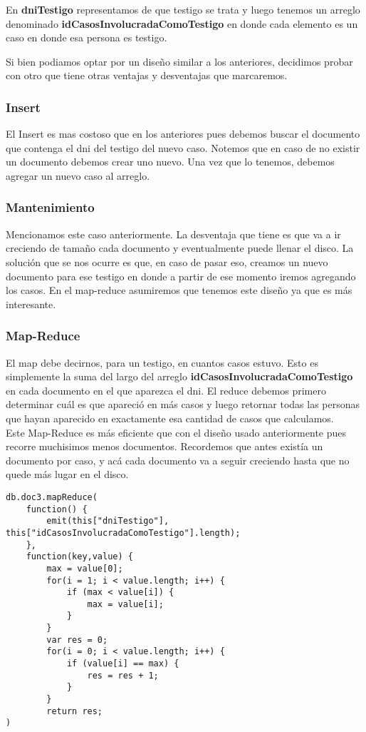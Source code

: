 \documentclass[11pt, a4paper]{article}
\begin{document}
En \textbf{dniTestigo} representamos de que testigo se trata y luego tenemos un arreglo denominado \textbf{idCasosInvolucradaComoTestigo} en donde cada elemento es un caso en donde esa persona es testigo.\

Si bien podiamos optar por un dise\~no similar a los anteriores, decidimos probar con otro que tiene otras ventajas y desventajas que marcaremos.

\subsubsection{Insert}

El Insert es mas costoso que en los anteriores pues debemos buscar el documento que contenga el dni del testigo del nuevo caso. Notemos que en caso de no existir un documento debemos crear uno nuevo. Una vez que lo tenemos, debemos agregar un nuevo caso al arreglo.

\subsubsection{Mantenimiento}

Mencionamos este caso anteriormente. La desventaja que tiene es que va a ir creciendo de tama\~no cada documento y eventualmente puede llenar el disco. La soluci\'on que se nos ocurre es que, en caso de pasar eso, creamos un nuevo documento para ese testigo en donde a partir de ese momento iremos agregando los casos. En el map-reduce asumiremos que tenemos este dise\~no ya que es m\'as interesante.

\subsubsection{Map-Reduce}

El map debe decirnos, para un testigo, en cuantos casos estuvo. Esto es simplemente la suma del largo del arreglo \textbf{idCasosInvolucradaComoTestigo} en cada documento en el que aparezca el dni. El reduce debemos primero determinar cu\'al es que apareci\'o en m\'as casos y luego retornar todas las personas que hayan aparecido en exactamente esa cantidad de casos que calculamos.\\

Este Map-Reduce es m\'as eficiente que con el dise\~no usado anteriormente pues recorre muchisimos menos documentos. Recordemos que antes exist\'ia un documento por caso, y ac\'a cada documento va a seguir creciendo hasta que no quede m\'as lugar en el disco.
\begin{lstlisting}
db.doc3.mapReduce(
    function() {
        emit(this["dniTestigo"], this["idCasosInvolucradaComoTestigo"].length);
    },
    function(key,value) { 
        max = value[0];
        for(i = 1; i < value.length; i++) {
            if (max < value[i]) { 
                max = value[i];  
            }
        }
        var res = 0;
        for(i = 0; i < value.length; i++) {
        	if (value[i] == max) {
        		res = res + 1;
        	}
        }
        return res;
)
\end{lstlisting}
\end{document}
